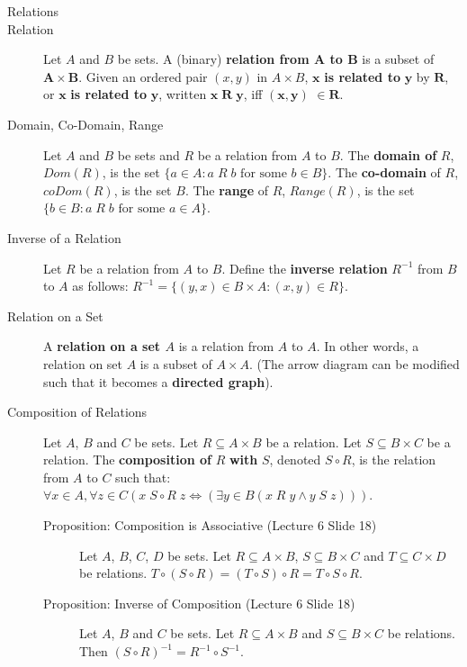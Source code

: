 \documentclass{article}
\begin{document}
\begin{description}
    \vspace{0.2cm}
    \item[\large Relations]
    \item[Relation]Let $A$ and $B$ be sets. A (binary) \textbf{relation from $\mathbf{A}$ to $\mathbf{B}$} is a subset of $\mathbf{A}\times\mathbf{B}$. Given an ordered pair $(x, y)$ in $A \times B$, $\mathbf{x}$ \textbf{is related to} $\mathbf{y}$ by $\mathbf{R}$, or $\mathbf{x}$ \textbf{is related to} $\mathbf{y}$, written $\mathbf{x}\;\mathbf{R}\;\mathbf{y}$, iff $(\mathbf{x}, \mathbf{y})$ $\in \mathbf{R}$. 
    \item[Domain, Co-Domain, Range]Let $A$ and $B$ be sets and $R$ be a relation from $A$ to $B$. The \textbf{domain of} $R$, $Dom(R)$, is the set $\{a\in A: a\;R\;b\text{ for some }b\in B\}$. The \textbf{co-domain} of $R$, $coDom(R)$, is the set $B$. The \textbf{range} of $R$, $Range(R)$, is the set $\{b \in B: a\;R\;b \text{ for some }a\in A\}$.
    \item[Inverse of a Relation]Let $R$ be a relation from $A$ to $B$. Define the \textbf{inverse relation} $R^{-1}$ from $B$ to $A$ as follows: $R^{-1}=\{(y,x)\in B\times A: (x,y) \in R\}$. 
    \item[Relation on a Set]A \textbf{relation on a set $A$} is a relation from $A$ to $A$. In other words, a relation on set $A$ is a subset of $A \times A$. (The arrow diagram can be modified such that it becomes a \textbf{directed graph}).
    \item[Composition of Relations]Let $A$, $B$ and $C$ be sets. Let $R \subseteq A \times B$ be a relation. Let $S \subseteq B \times C$ be a relation. The \textbf{composition of} $R$ \textbf{with} $S$, denoted $S \circ R$, is the relation from $A$ to $C$ such that: $\forall x\in A , \forall z\in C (x\;S\circ R\;z \Leftrightarrow (\exists y\in B(x\;R\;y \land y\;S\;z)))$.
    \begin{description}
    	\item[Proposition: Composition is Associative (Lecture 6 Slide 18)]Let $A$, $B$, $C$, $D$ be sets. Let $R \subseteq A \times B$, $S\subseteq B \times C$ and $T \subseteq C \times D$ be relations. $T \circ (S \circ R) = (T \circ S) \circ R = T \circ S \circ R$.
		\item[Proposition: Inverse of Composition (Lecture 6 Slide 18)]Let $A$, $B$ and $C$ be sets. Let $R\subseteq A \times B$ and $S\subseteq B \times C$ be relations. Then $(S\circ R)^{-1} = R^{-1} \circ S^{-1}$.
    \end{description}

\end{description}
\end{document}
